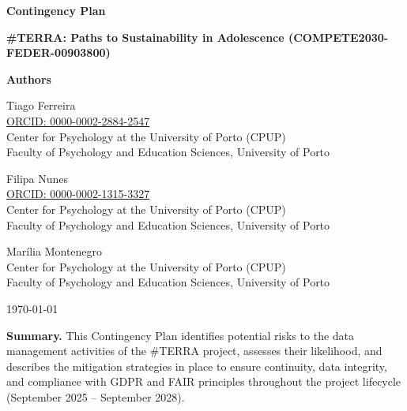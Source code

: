 
\vspace*{2.5cm}

\begin{center}
  {\LARGE \textbf{Contingency Plan}\par}
  \vspace{1.0cm}
  {\large \textbf{\#TERRA: Paths to Sustainability in Adolescence (COMPETE2030-FEDER-00903800)}\par}
  \vspace{1.5cm}
\end{center}

\begin{center}
\textbf{Authors}

\vspace{0.5cm}

Tiago Ferreira\\
\href{https://orcid.org/0000-0002-2884-2547}{ORCID: 0000-0002-2884-2547}\\
Center for Psychology at the University of Porto (CPUP)\\
Faculty of Psychology and Education Sciences, University of Porto

\vspace{0.6cm}

Filipa Nunes\\
\href{https://orcid.org/0000-0002-1315-3327}{ORCID: 0000-0002-1315-3327}\\
Center for Psychology at the University of Porto (CPUP)\\
Faculty of Psychology and Education Sciences, University of Porto

\vspace{0.6cm}

Mar\'{i}lia Montenegro\\
Center for Psychology at the University of Porto (CPUP)\\
Faculty of Psychology and Education Sciences, University of Porto

\vspace{1.2cm}

{\large \today}
\end{center}

\vspace{1.5cm}

\noindent
\textbf{Summary.} This Contingency Plan identifies potential risks to the data management activities of the \#TERRA project, assesses their likelihood, and describes the mitigation strategies in place to ensure continuity, data integrity, and compliance with GDPR and FAIR principles throughout the project lifecycle (September 2025 -- September 2028).

\vfill

